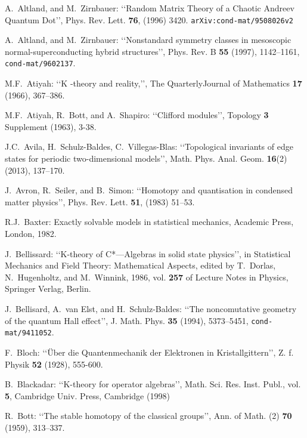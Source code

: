 \documentclass[11pt]{article}
\begin{document}
\begin{thebibliography}{99}


A.\  Altland, and M.\  Zirnbauer: \lq\lq Random Matrix Theory of a Chaotic Andreev Quantum Dot\rq\rq, Phys. Rev. Lett. {\bf 76},  (1996) 3420.
{\tt  arXiv:cond-mat/9508026v2}

A.\  Altland, and M.\  Zirnbauer: \lq\lq Nonstandard symmetry classes in mesoscopic normal-superconducting hybrid
structures\rq\rq , Phys. Rev. B {\bf 55} (1997), 1142--1161, {\tt cond-mat/9602137}.

M.F.\ Atiyah: \lq\lq K -theory and reality,\rq\rq, The QuarterlyJournal of Mathematics {\bf 17} (1966), 367--386.

M.F.\ Atiyah, R.\ Bott, and A.\ Shapiro: \lq\lq Clifford modules\rq\rq , Topology {\bf 3} Supplement (1963), 3-38.

J.C.\ Avila, H.\ Schulz-Baldes, C.\ Villegas-Blas: \lq\lq Topological invariants of edge states for periodic two-dimensional models\rq\rq,  Math. Phys. Anal. Geom. {\bf 16}(2)  (2013), 137--170.

J.\  Avron, R.\  Seiler, and B.\  Simon:  \lq\lq Homotopy and quantisation in condensed matter physics\rq\rq, Phys. Rev. Lett.
{\bf 51}, (1983) 51--53.

R.J.\ Baxter: Exactly solvable models in statistical mechanics, Academic Press, London, 1982.

J.\  Bellissard: \lq\lq K-theory of C*—Algebras in solid state physics\rq\rq,  in Statistical Mechanics and Field Theory: Mathematical Aspects, edited by T.\  Dorlas,
N.\  Hugenholtz, and M.\  Winnink, 1986, vol. {\bf 257} of Lecture Notes in Physics, Springer Verlag, Berlin.

J.\  Bellisard, A.\ van Elst, and H.\ Schulz-Baldes: \lq\lq The noncomutative geometry of the quantum Hall effect\rq\rq, J. Math. Phys. {\bf 35} (1994), 5373--5451, {\tt cond-mat/9411052}.

F.\  Bloch: \lq\lq \"Uber die Quantenmechanik der Elektronen in Kristallgittern\rq\rq, Z. f. Physik {\bf 52} (1928), 555-600.

B.\ Blackadar: \lq\lq K-theory for operator algebras\rq\rq, Math. Sci. Res. Inst. Publ., vol. {\bf 5}, Cambridge Univ. Press, Cambridge (1998)

 R.\ Bott:  \lq\lq The stable homotopy of the classical groups\rq\rq,  Ann. of Math. (2) {\bf 70} (1959), 313--337.


\end{thebibliography}
\end{document}

